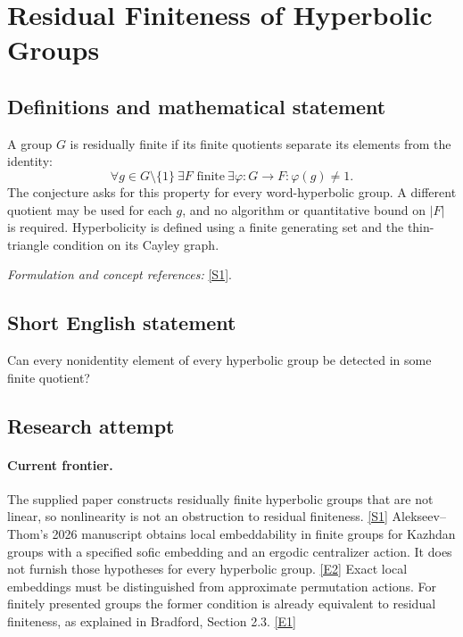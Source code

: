 \documentclass[11pt,a4paper]{article}
\newcommand{\sref}[2]{\hyperlink{source:#1:#2}{[S#2]}}
\newcommand{\eref}[2]{\hyperlink{extra:#1:#2}{[E#2]}}
\newif\ifshowcatalogue
\newcommand{\cataloguescope}[1]{\ifshowcatalogue
 \paragraph{Exact scope in the supplied catalogue.}
 \begin{quote}\small #1\end{quote}\fi}
\numberwithin{equation}{section}
\begin{document}
\setcounter{section}{0}
\clearpage
\section*{\texorpdfstring{Residual Finiteness of Hyperbolic Groups}{Residual Finiteness of Hyperbolic Groups}}\label{statement}
\subsection{Definitions and mathematical statement}
A group $G$ is residually finite if its finite quotients separate its elements from the identity:
\[
 \forall g\in G\setminus\{1\}\ \exists F\text{ finite}\ \exists\varphi:G\to F:
 \varphi(g)\ne1.
\]
The conjecture asks for this property for every word-hyperbolic group. A different quotient may be used for each $g$, and no algorithm or quantitative bound on $|F|$ is required. Hyperbolicity is defined using a finite generating set and the thin-triangle condition on its Cayley graph.
\par\smallskip\textit{Formulation and concept references:} \sref{statement}{1}.
\cataloguescope{For every word-hyperbolic group G and every nonidentity element g in G, prove that there is a finite group F and a homomorphism \ensuremath{\varphi}:G\ensuremath{\to}F with \ensuremath{\varphi}(g)\ensuremath{\ne}1.}
\subsection{Short English statement}
Can every nonidentity element of every hyperbolic group be detected in some finite quotient?
\subsection{Research attempt}

\paragraph{Current frontier.}
The supplied paper constructs residually finite hyperbolic groups that are
not linear, so nonlinearity is not an obstruction to residual finiteness.
\sref{statement}{1} Alekseev--Thom's 2026 manuscript obtains local embeddability
in finite groups for Kazhdan groups with a specified sofic embedding and an
ergodic centralizer action. It does not furnish those hypotheses for every
hyperbolic group. \eref{statement}{2} Exact local embeddings must be distinguished
from approximate permutation actions. For finitely presented groups the
former condition is already equivalent to residual finiteness, as explained
in Bradford, Section 2.3. \eref{statement}{1}
\end{document}

